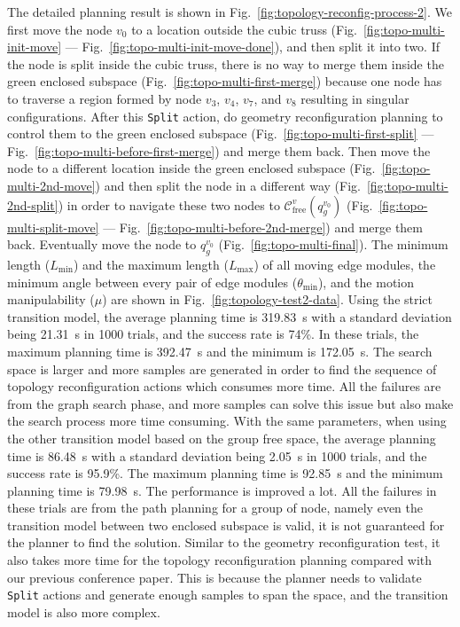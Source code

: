 \documentclass[journal]{IEEEtran}
\begin{document}
The detailed planning result is shown in
Fig.~\ref{fig:topology-reconfig-process-2}. We first move the node
$v_0$ to a location outside the cubic truss
(Fig.~\ref{fig:topo-multi-init-move} ---
Fig.~\ref{fig:topo-multi-init-move-done}), and then split it into
two. If the node is split inside the cubic truss, there is no way to
merge them inside the green enclosed subspace
(Fig.~\ref{fig:topo-multi-first-merge}) because one node has to
traverse a region formed by node $v_3$, $v_4$, $v_7$, and $v_8$
resulting in singular configurations. After this \texttt{Split}
action, do geometry reconfiguration planning to control them to the
green enclosed subspace (Fig.~\ref{fig:topo-multi-first-split} ---
Fig.~\ref{fig:topo-multi-before-first-merge}) and merge them
back. Then move the node to a different location inside the green
enclosed subspace (Fig.~\ref{fig:topo-multi-2nd-move}) and then split
the node in a different way (Fig.~\ref{fig:topo-multi-2nd-split}) in
order to navigate these two nodes to
$\mathcal{C}_{\mathrm{free}}^v(q_g^{v_0})$
(Fig.~\ref{fig:topo-multi-split-move} ---
Fig.~\ref{fig:topo-multi-before-2nd-merge}) and merge them
back. Eventually move the node to $q_g^{v_0}$
(Fig.~\ref{fig:topo-multi-final}). The minimum length ($L_{\min}$) and
the maximum length ($L_{\max}$) of all moving edge modules, the
minimum angle between every pair of edge modules ($\theta_{\min}$),
and the motion manipulability ($\mu$) are shown in
Fig.~\ref{fig:topology-test2-data}. Using the strict transition model,
the average planning time is \SI{319.83}{s} with a standard deviation
being \SI{21.31}{s} in 1000 trials, and the success rate is 74\%. In
these trials, the maximum planning time is \SI{392.47}{s} and the
minimum is \SI{172.05}{s}. The search space is larger and more samples
are generated in order to find the sequence of topology
reconfiguration actions which consumes more time. All the failures are
from the graph search phase, and more samples can solve this issue but
also make the search process more time consuming. With the same
parameters, when using the other transition model based on the group
free space, the average planning time is \SI{86.48}{s} with a standard
deviation being \SI{2.05}{s} in 1000 trials, and the success rate is
95.9\%. The maximum planning time is \SI{92.85}{s} and the minimum
planning time is \SI{79.98}{s}. The performance is improved a lot. All
the failures in these trials are from the path planning for a group of
node, namely even the transition model between two enclosed subspace
is valid, it is not guaranteed for the planner to find the
solution. Similar to the geometry reconfiguration test, it also takes
more time for the topology reconfiguration planning compared with our
previous conference paper. This is because the planner needs to
validate \texttt{Split} actions and generate enough samples to span
the space, and the transition model is also more complex.
\end{document}
